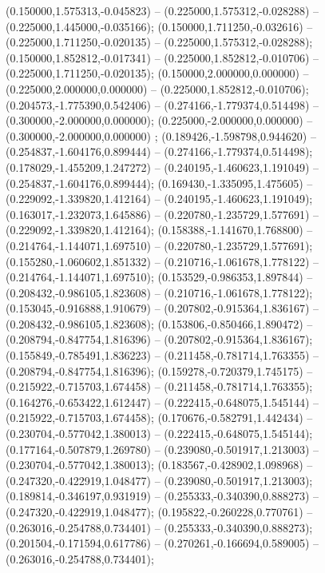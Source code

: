  (0.150000,1.575313,-0.045823) -- (0.225000,1.575312,-0.028288) -- (0.225000,1.445000,-0.035166);
 (0.150000,1.711250,-0.032616) -- (0.225000,1.711250,-0.020135) -- (0.225000,1.575312,-0.028288);
 (0.150000,1.852812,-0.017341) -- (0.225000,1.852812,-0.010706) -- (0.225000,1.711250,-0.020135);
 (0.150000,2.000000,0.000000) -- (0.225000,2.000000,0.000000) -- (0.225000,1.852812,-0.010706);
 (0.204573,-1.775390,0.542406) -- (0.274166,-1.779374,0.514498) -- (0.300000,-2.000000,0.000000);
 (0.225000,-2.000000,0.000000) -- (0.300000,-2.000000,0.000000) ;
 (0.189426,-1.598798,0.944620) -- (0.254837,-1.604176,0.899444) -- (0.274166,-1.779374,0.514498);
 (0.178029,-1.455209,1.247272) -- (0.240195,-1.460623,1.191049) -- (0.254837,-1.604176,0.899444);
 (0.169430,-1.335095,1.475605) -- (0.229092,-1.339820,1.412164) -- (0.240195,-1.460623,1.191049);
 (0.163017,-1.232073,1.645886) -- (0.220780,-1.235729,1.577691) -- (0.229092,-1.339820,1.412164);
 (0.158388,-1.141670,1.768800) -- (0.214764,-1.144071,1.697510) -- (0.220780,-1.235729,1.577691);
 (0.155280,-1.060602,1.851332) -- (0.210716,-1.061678,1.778122) -- (0.214764,-1.144071,1.697510);
 (0.153529,-0.986353,1.897844) -- (0.208432,-0.986105,1.823608) -- (0.210716,-1.061678,1.778122);
 (0.153045,-0.916888,1.910679) -- (0.207802,-0.915364,1.836167) -- (0.208432,-0.986105,1.823608);
 (0.153806,-0.850466,1.890472) -- (0.208794,-0.847754,1.816396) -- (0.207802,-0.915364,1.836167);
 (0.155849,-0.785491,1.836223) -- (0.211458,-0.781714,1.763355) -- (0.208794,-0.847754,1.816396);
 (0.159278,-0.720379,1.745175) -- (0.215922,-0.715703,1.674458) -- (0.211458,-0.781714,1.763355);
 (0.164276,-0.653422,1.612447) -- (0.222415,-0.648075,1.545144) -- (0.215922,-0.715703,1.674458);
 (0.170676,-0.582791,1.442434) -- (0.230704,-0.577042,1.380013) -- (0.222415,-0.648075,1.545144);
 (0.177164,-0.507879,1.269780) -- (0.239080,-0.501917,1.213003) -- (0.230704,-0.577042,1.380013);
 (0.183567,-0.428902,1.098968) -- (0.247320,-0.422919,1.048477) -- (0.239080,-0.501917,1.213003);
 (0.189814,-0.346197,0.931919) -- (0.255333,-0.340390,0.888273) -- (0.247320,-0.422919,1.048477);
 (0.195822,-0.260228,0.770761) -- (0.263016,-0.254788,0.734401) -- (0.255333,-0.340390,0.888273);
 (0.201504,-0.171594,0.617786) -- (0.270261,-0.166694,0.589005) -- (0.263016,-0.254788,0.734401);
